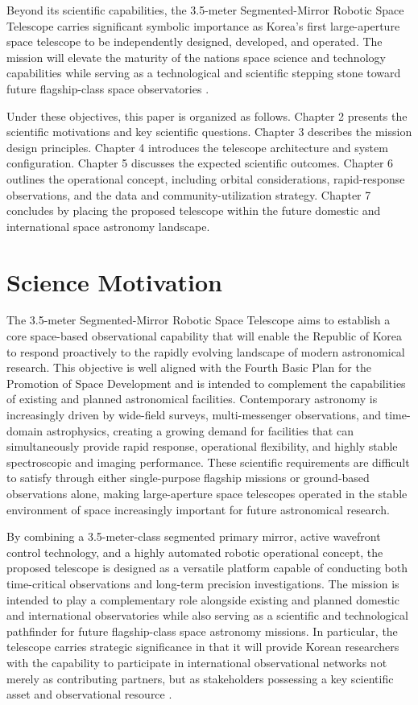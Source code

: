 Beyond its scientific capabilities, the 3.5-meter Segmented-Mirror Robotic Space Telescope carries significant symbolic importance as Korea's first large-aperture space telescope to be independently designed, developed, and operated. The mission will elevate the maturity of the nation\textquotesingle s space science and technology capabilities while serving as a technological and scientific stepping stone toward future flagship-class space observatories \cite{roman2026,zurlo2024}.

Under these objectives, this paper is organized as follows. Chapter 2 presents the scientific motivations and key scientific questions. Chapter 3 describes the mission design principles. Chapter 4 introduces the telescope architecture and system configuration. Chapter 5 discusses the expected scientific outcomes. Chapter 6 outlines the operational concept, including orbital considerations, rapid-response observations, and the data and community-utilization strategy. Chapter 7 concludes by placing the proposed telescope within the future domestic and international space astronomy landscape.

\chapter{Science Motivation}

The 3.5-meter Segmented-Mirror Robotic Space Telescope aims to establish a core space-based observational capability that will enable the Republic of Korea to respond proactively to the rapidly evolving landscape of modern astronomical research. This objective is well aligned with the Fourth Basic Plan for the Promotion of Space Development and is intended to complement the capabilities of existing and planned astronomical facilities. Contemporary astronomy is increasingly driven by wide-field surveys, multi-messenger observations, and time-domain astrophysics, creating a growing demand for facilities that can simultaneously provide rapid response, operational flexibility, and highly stable spectroscopic and imaging performance. These scientific requirements are difficult to satisfy through either single-purpose flagship missions or ground-based observations alone, making large-aperture space telescopes operated in the stable environment of space increasingly important for future astronomical research.

By combining a 3.5-meter-class segmented primary mirror, active wavefront control technology, and a highly automated robotic operational concept, the proposed telescope is designed as a versatile platform capable of conducting both time-critical observations and long-term precision investigations. The mission is intended to play a complementary role alongside existing and planned domestic and international observatories while also serving as a scientific and technological pathfinder for future flagship-class space astronomy missions. In particular, the telescope carries strategic significance in that it will provide Korean researchers with the capability to participate in international observational networks not merely as contributing partners, but as stakeholders possessing a key scientific asset and observational resource \cite{roman2026,zurlo2024}.

